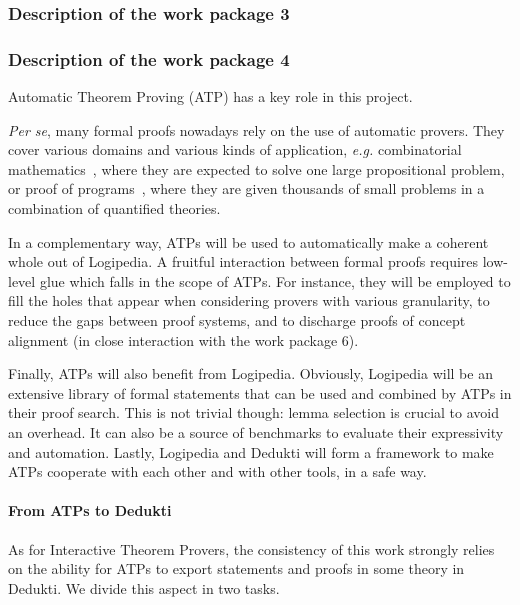 \subsubsection{Description of the work package 3}

\subsubsection{Description of the work package 4}

Automatic Theorem Proving (ATP) has a key role in this project.

{\em Per se}, many formal proofs nowadays rely on the use of automatic
provers. They cover various domains and various kinds of application,
{\em e.g.} combinatorial
mathematics~\cite{DBLP:journals/ai/KonevL15,DBLP:conf/sat/HeuleKM16},
where they are expected to solve one large propositional problem, or
proof of
programs~\cite{DBLP:conf/esop/FilliatreP13,DBLP:journals/pacmpl/ProtzenkoZRRWBD17},
where they are given thousands of small problems in a combination of
quantified theories.

In a complementary way, ATPs will be used to automatically make a
coherent whole out of {\sf Logipedia}. A fruitful interaction between
formal proofs requires low-level glue which falls in the scope of ATPs.
For instance, they will be employed to fill the holes that appear when
considering provers with various granularity, to reduce the gaps between
proof systems, and to discharge proofs of concept alignment (in close
interaction with the work package 6).

Finally, ATPs will also benefit from {\sf Logipedia}. Obviously, {\sf
  Logipedia} will be an extensive library of formal statements that can
be used and combined by ATPs in their proof search. This is not trivial
though: lemma selection is crucial to avoid an overhead. It can also be
a source of benchmarks to evaluate their expressivity and automation.
Lastly, {\sf Logipedia} and {\sf Dedukti} will form a framework to make
ATPs cooperate with each other and with other tools, in a safe way.


\paragraph{From ATPs to {\sf Dedukti}}

As for Interactive Theorem Provers, the consistency of this work
strongly relies on the ability for ATPs to export statements and proofs
in some theory in {\sf Dedukti}. We divide this aspect in two tasks.

